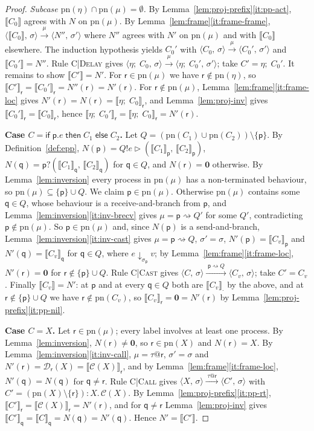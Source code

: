 \documentclass[11pt]{article}
\makeatletter
\theoremstyle{plain}
\theoremstyle{definition}
\theoremstyle{remark}
\newcommand{\kw}[1]{\mathsf{#1}}
\newcommand{\kif}{\kw{if}\;}
\newcommand{\kthen}{\;\kw{then}\;}
\newcommand{\kelse}{\;\kw{else}\;}
\newcommand{\nil}{\mathbf{0}}
\newcommand{\seq}{;\;}
\newcommand{\pp}{\mathsf{p}}
\newcommand{\qq}{\mathsf{q}}
\newcommand{\rr}{\mathsf{r}}
\newcommand{\pn}{\mathrm{pn}}
\newcommand{\eval}[3]{#1 \downarrow_{#2} #3}
\newcommand{\conf}[2]{\langle #1,\, #2\rangle}
\newcommand{\lto}[1]{\xrightarrow{\;#1\;}}
\newcommand{\proj}[2]{\llbracket #1 \rrbracket_{#2}}
\newcommand{\projn}[1]{\llbracket #1 \rrbracket}
\newcommand{\tauat}[1]{\tau\mathord{@}#1}
\newcommand{\cast}[2]{#1 \rightsquigarrow #2}
\newcommand{\rn}[1]{{\normalfont\scshape #1}}
\newcommand{\ifcond}[3]{\kif #1 \kthen #2 \kelse #3}
\newcommand{\sendbr}[4]{#1!#2 \mathbin{\triangleright} (#3,\, #4)}
\newcommand{\recvbr}[3]{#1?(#2,\, #3)}
\newcommand{\case}[1]{\medskip\noindent\textbf{Case #1.}\;}
\newcommand{\subcase}[1]{\smallskip\noindent\textit{Subcase #1.}\;}
\newcommand{\Defs}{\mathcal{C}}
\newcommand{\NDefs}{\mathcal{D}}
\newcommand{\body}[1]{\Defs(#1)}
\newcommand{\ldef}[2]{\NDefs_{#1}(#2)}
\newcommand{\rt}[3]{#1\mathbin{:}#2.\,#3}
\makeatother
\begin{document}
\begin{proof}
  \subcase{$\pn(\eta)\cap\pn(\mu) = \emptyset$}
  By Lemma~\ref{lem:proj-prefix}\ref{it:pp-act}, $\projn{C_0}$ agrees with
  $N$ on $\pn(\mu)$.  By Lemma~\ref{lem:frame}\ref{it:frame-frame},
  $\conf{\projn{C_0}}{\sigma}\lto{\mu}\conf{N''}{\sigma'}$ where $N''$ agrees
  with $N'$ on $\pn(\mu)$ and with $\projn{C_0}$ elsewhere.  The induction
  hypothesis yields $C_0'$ with $\conf{C_0}{\sigma}\lto{\mu}\conf{C_0'}{\sigma'}$
  and $\projn{C_0'} = N''$.  Rule \rn{C|Delay} gives
  $\conf{\eta\seq C_0}{\sigma}\lto{\mu}\conf{\eta\seq C_0'}{\sigma'}$; take
  $C' = \eta\seq C_0'$.  It remains to show $\projn{C'} = N'$.  For
  $\rr\in\pn(\mu)$ we have $\rr\notin\pn(\eta)$, so
  $\proj{C'}{\rr} = \proj{C_0'}{\rr} = N''(\rr) = N'(\rr)$.  For
  $\rr\notin\pn(\mu)$, Lemma~\ref{lem:frame}\ref{it:frame-loc} gives
  $N'(\rr) = N(\rr) = \proj{\eta\seq C_0}{\rr}$, and Lemma~\ref{lem:proj-inv}
  gives $\proj{C_0'}{\rr} = \proj{C_0}{\rr}$, hence
  $\proj{\eta\seq C_0'}{\rr} = \proj{\eta\seq C_0}{\rr} = N'(\rr)$.

  \case{$C = \ifcond{\pp.e}{C_1}{C_2}$}
  Let $Q = (\pn(C_1)\cup\pn(C_2))\setminus\{\pp\}$.  By
  Definition~\ref{def:epp}, $N(\pp) = \sendbr{Q}{e}{\proj{C_1}{\pp}}{\proj{C_2}{\pp}}$,
  $N(\qq) = \recvbr{\pp}{\proj{C_1}{\qq}}{\proj{C_2}{\qq}}$ for $\qq\in Q$, and
  $N(\rr) = \nil$ otherwise.  By Lemma~\ref{lem:inversion} every process in
  $\pn(\mu)$ has a non-terminated behaviour, so $\pn(\mu)\subseteq\{\pp\}\cup Q$.
  We claim $\pp\in\pn(\mu)$.  Otherwise $\pn(\mu)$ contains some $\qq\in Q$,
  whose behaviour is a receive-and-branch from $\pp$, and
  Lemma~\ref{lem:inversion}\ref{it:inv-brecv} gives $\mu = \cast{\pp}{Q'}$ for
  some $Q'$, contradicting $\pp\notin\pn(\mu)$.  So $\pp\in\pn(\mu)$ and, since
  $N(\pp)$ is a send-and-branch, Lemma~\ref{lem:inversion}\ref{it:inv-cast}
  gives $\mu = \cast{\pp}{Q}$, $\sigma' = \sigma$, $N'(\pp) = \proj{C_v}{\pp}$
  and $N'(\qq) = \proj{C_v}{\qq}$ for $\qq\in Q$, where $\eval{e}{\sigma_\pp}{v}$;
  by Lemma~\ref{lem:frame}\ref{it:frame-loc}, $N'(\rr) = \nil$ for
  $\rr\notin\{\pp\}\cup Q$.  Rule \rn{C|Cast} gives
  $\conf{C}{\sigma}\lto{\cast{\pp}{Q}}\conf{C_v}{\sigma}$; take $C' = C_v$.
  Finally $\projn{C_v} = N'$: at $\pp$ and at every $\qq\in Q$ both are
  $\proj{C_v}{\cdot}$ by the above, and at $\rr\notin\{\pp\}\cup Q$ we have
  $\rr\notin\pn(C_v)$, so $\proj{C_v}{\rr} = \nil = N'(\rr)$ by
  Lemma~\ref{lem:proj-prefix}\ref{it:pp-nil}.

  \case{$C = X$}
  Let $\rr\in\pn(\mu)$; every label involves at least one process.  By
  Lemma~\ref{lem:inversion}, $N(\rr)\neq\nil$, so $\rr\in\pn(X)$ and
  $N(\rr) = X$.  By Lemma~\ref{lem:inversion}\ref{it:inv-call},
  $\mu = \tauat\rr$, $\sigma' = \sigma$ and
  $N'(\rr) = \ldef{\rr}{X} = \proj{\body{X}}{\rr}$, and by
  Lemma~\ref{lem:frame}\ref{it:frame-loc}, $N'(\qq) = N(\qq)$ for
  $\qq\neq\rr$.  Rule \rn{C|Call} gives
  $\conf{X}{\sigma}\lto{\tauat\rr}\conf{C'}{\sigma}$ with
  $C' = \rt{(\pn(X)\setminus\{\rr\})}{X}{\body{X}}$.  By
  Lemma~\ref{lem:proj-prefix}\ref{it:pp-rt},
  $\proj{C'}{\rr} = \proj{\body{X}}{\rr} = N'(\rr)$, and for $\qq\neq\rr$
  Lemma~\ref{lem:proj-inv} gives $\proj{C'}{\qq} = \proj{C}{\qq} = N(\qq) = N'(\qq)$.
  Hence $N' = \projn{C'}$.


\end{proof}
\end{document}
